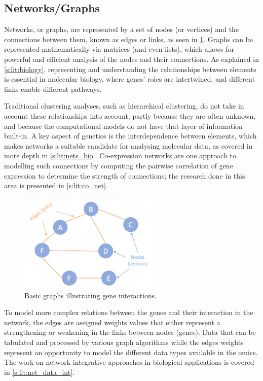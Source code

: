 \subsection{Networks/Graphs} \label{s:lit:graph_overview}

Networks, or graphs, are represented by a set of nodes (or vertices) and the connections between them, known as edges or links, as seen in \cref{fig:graphs_basic}. Graphs can be represented mathematically via matrices (and even lists), which allows for powerful and efficient analysis of the nodes and their connections. As explained in \cref{s:lit:biology}, representing and understanding the relationships between elements is essential in molecular biology, where genes' roles are intertwined, and different links enable different pathways.

Traditional clustering analyses, such as hierarchical clustering, do not take in account these relationships into account, partly because they are often unknown, and because the computational models do not have that layer of information built-in. A key aspect of genetics is the interdependence between elements, which makes networks a suitable candidate for analysing molecular data, as covered in more depth in \cref{s:lit:nets_bio}. Co-expression networks are one approach to modelling such connections by computing the pairwise correlation of gene expression to determine the strength of connections; the research done in this area is presented in \cref{s:lit:co_net}.

\begin{figure}[!t]
  \centering\includegraphics[width=0.6\textwidth,keepaspectratio]{Sections/Lit_review/Resources/basic_graphs.png}
    \caption[Basic graph]{Basic graphs illustrating gene interactions.}
    \label{fig:graphs_basic}
\end{figure}

To model more complex relations between the genes and their interaction in the network, the edges are assigned weights values that either represent a strengthening or weakening in the links between nodes (genes). Data that can be tabulated and processed by various graph algorithms while the edges weights represent an opportunity to model the different data types available in the omics. The work on network integrative approaches in biological applications is covered in \cref{s:lit:net_data_int}.


